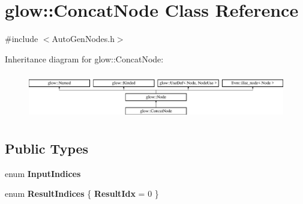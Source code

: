 \hypertarget{classglow_1_1_concat_node}{}\section{glow\+:\+:Concat\+Node Class Reference}
\label{classglow_1_1_concat_node}


{\ttfamily \#include $<$Auto\+Gen\+Nodes.\+h$>$}

Inheritance diagram for glow\+:\+:Concat\+Node\+:\begin{figure}[H]
\begin{center}
\leavevmode
\includegraphics[height=2.028986cm]{classglow_1_1_concat_node}
\end{center}
\end{figure}
\subsection*{Public Types}
\begin{DoxyCompactItemize}
\item 
\mbox{\label{classglow_1_1_concat_node_a8ad645a036a6cb6dc6098c26486a3fea}} 
enum {\bfseries Input\+Indices} 
\item 
\mbox{\label{classglow_1_1_concat_node_a26ebcc8a81b5d1c16a289939008eec28}} 
enum {\bfseries Result\+Indices} \{ {\bfseries Result\+Idx} = 0
 \}
\end{DoxyCompactItemize}
